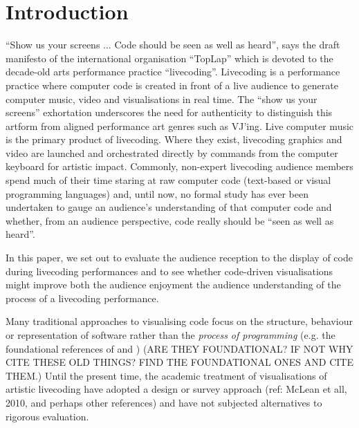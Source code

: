 \documentclass{sig-alternate}
\begin{document}



\section{Introduction}

``Show us your screens ... Code should be seen as well as heard'', says the draft manifesto of the international organisation ``TopLap'' \cite{Toplap} which is devoted to the decade-old arts performance practice ``livecoding''. Livecoding is a performance practice where computer code is created in front of a live audience to generate computer music, video and visualisations in real time. The ``show us your screens'' exhortation underscores the need for authenticity to distinguish this artform from aligned performance art genres such as VJ'ing. Live computer music is the primary product of livecoding. Where they exist, livecoding graphics and video are launched and orchestrated directly by commands from the computer keyboard for artistic impact. Commonly, non-expert livecoding audience members spend much of their time staring at raw computer code (text-based or visual programming languages) and, until now, no formal study has ever been undertaken to gauge an audience's understanding of that computer code and whether, from an audience perspective, code really should be ``seen as well as heard''. 

In this paper, we set out to evaluate the audience reception to the display of code during livecoding performances and to see whether code-driven visualisations  might improve both the audience enjoyment the audience understanding of the process of a livecoding performance.
  
Many traditional approaches to visualising code focus on the structure, behaviour or representation of software rather than the {\it process of programming} (e.g. the foundational references of \cite{Ball1996} and \cite{Price1992}) (ARE THEY FOUNDATIONAL? IF NOT WHY CITE THESE OLD THINGS? FIND THE FOUNDATIONAL ONES AND CITE THEM.) Until the present time, the academic treatment of visualisations of artistic livecoding have adopted a design or survey approach (ref: McLean et all, 2010, and perhaps other references) and have not subjected alternatives to rigorous evaluation.

\end{document}
